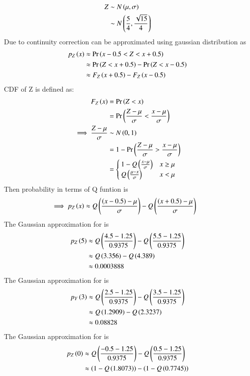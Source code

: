 \documentclass[journal,12pt,twocolumn]{IEEEtran}
\theoremstyle{remark}
\begin{document}
\begin{enumerate}[label=(\roman*)]
\begin{align}
Z &\sim N\left(\mu,\sigma\right)\\
&\sim N\left(\frac{5}{4},\frac{\sqrt{15}}{4}\right)
\end{align}
Due to continuity correction  can be approximated using gaussian distribution as
\begin{align}
	p_Z\left(x\right)&\approx\Pr\left(x-0.5<Z<x+0.5\right)\\
	&\approx\Pr\left(Z<x+0.5\right)-\Pr\left(Z<x-0.5\right)	\\
	&\approx F_Z\left(x+0.5\right)-F_Z\left(x-0.5\right)
\end{align}
CDF of Z is defined as:
\begin{align}
	F_Z\left(x\right)&=\Pr\left(Z<x\right)\\
	&=\Pr\left(\frac{Z-\mu}{\sigma}<\frac{x-\mu}{\sigma}\right)\\
	\implies \frac{Z-\mu}{\sigma} &\sim N\left(0,1\right)\\
	&=1-\Pr\left(\frac{Z-\mu}{\sigma}>\frac{x-\mu}{\sigma}\right)\\
	&=\begin{cases}
		1-Q\left(\frac{x-\mu}{\sigma}\right) & x \geq \mu\\
		Q\left(\frac{\mu -x}{\sigma}\right) & x < \mu 
	\end{cases}
\end{align}
Then probability in terms of Q funtion is
\begin{align}
	\implies p_Z\left(x\right)&\approx Q\left(\frac{\left(x-0.5\right)-\mu}{\sigma}\right)-Q\left(\frac{\left(x+0.5\right)-\mu}{\sigma}\right)
\end{align}
	The Gaussian approximation for  is
	\begin{align}
		p_Z\left(5\right)&\approx Q\left(\frac{4.5 - 1.25}{0.9375}\right) -Q\left(\frac{5.5 -1.25}{0.9375}\right)\\
	&\approx Q\left(3.356\right) - Q\left(4.389\right)\\
	&\approx 0.0003888
	\end{align}
	The Gaussian approximation for  is
	\begin{align}
		p_Y\left(3\right) &\approx Q\left(\frac{2.5 - 1.25}{0.9375}\right) -Q\left(\frac{3.5 -1.25}{0.9375}\right)\\
	&\approx Q\left(1.2909\right) - Q\left(2.3237\right)\\
	&\approx 0.08828
	\end{align} 
	The Gaussian approximation for  is
	\begin{align}
		p_Z\brak{0}
	&\approx \qfunc{\frac{-0.5 - 1.25}{0.9375}} -\qfunc{\frac{0.5 -1.25}{0.9375}}\\
	&\approx \brak{1-\qfunc{1.8073}} - \brak{1-\qfunc{0.7745}}\\

\end{align}
\end{enumerate}
\end{document}
